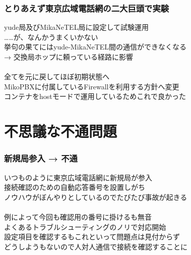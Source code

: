 \documentclass[
  lualatex,
  aspectratio=169,
  14pt
]{beamer}
\begin{document}
\begin{frame}
  \frametitle{とりあえず東京広域電話網の二大巨頭で実験}

  yude局及びMikaNeTEL局に設定して試験運用\\
  \hspace{1.5\zw}……が、なんかうまくいかない\\
  \hspace{1.5\zw}挙句の果てにはyude-MikaNeTEL間の通信ができなくなる\\
  \hspace{1.5\zw}→ 交換局ホップに頼っている経路に影響
  \\~\\[-.5\baselineskip]

  全てを元に戻してほぼ初期状態へ\\
  \hspace{1.5\zw}MikoPBXに付属しているFirewallを利用する方針へ変更\\
  \hspace{1.5\zw}コンテナをhostモードで運用しているためこれで良かった

  \note{ }
\end{frame}

\section{不思議な不通問題}
\note{ }

\begin{frame}
  \frametitle{新規局参入 → 不通}

  いつものように東京広域電話網に新規局が参入\\
  \hspace{1.5\zw}接続確認のための自動応答番号を設置しがち\\
  \hspace{1.5\zw}ノウハウがぼんやりとしているのでたびたび事故が起きる
  \\~\\[-.5\baselineskip]

  例によって今回も確認用の番号に掛けるも無音\\
  \hspace{1.5\zw}よくあるトラブルシューティングのノリで対応開始\\
  \hspace{1.5\zw}設定項目を確認するもこれといって問題点は見付からず\\
  \hspace{1.5\zw}どうしようもないので人対人通信で接続を確認することに

  \note{ }
\end{frame}
\end{document}

